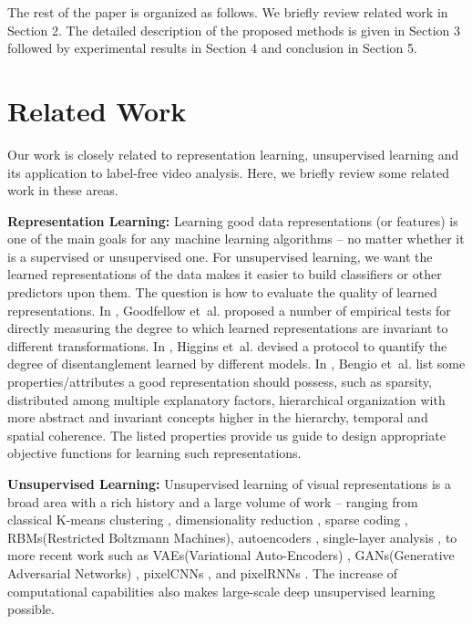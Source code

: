 \documentclass{article}
\begin{document}
The rest of the paper is organized as follows. We briefly review related work 
in Section 2. The detailed description of the proposed methods is given in
Section 3 followed by experimental results in Section 4 and conclusion in 
Section 5.

\section{Related Work}
Our work is closely related to representation learning, unsupervised 
learning and its application to label-free video analysis. Here, we briefly review some related work in these areas.

\textbf{Representation Learning:}  Learning good data representations (or 
features) is one of the main goals for any machine learning algorithms -- no 
matter whether it is a supervised or unsupervised one. For unsupervised 
learning, we want the learned representations of the data makes it easier to 
build classifiers or other predictors upon them. The question is how to 
evaluate the quality of learned representations. In \cite{Goodfellow08}, 
Goodfellow et~al. proposed a number of empirical tests for directly measuring 
the degree to which learned representations are invariant to different 
transformations.  In \cite{Higgins16}, Higgins et~al. devised a protocol to 
quantify the degree of disentanglement learned by different models. In 
\cite{Bengio13}, Bengio et~al. list some properties/attributes a good 
representation should possess, such as sparsity, distributed among multiple 
explanatory factors, hierarchical organization with more abstract and 
invariant concepts \cite{Hubel62, Wiskott02} higher in the hierarchy, temporal 
and spatial coherence. The listed properties provide us guide to design 
appropriate objective functions for learning such representations.

\textbf{Unsupervised Learning:}  Unsupervised learning of visual 
representations is a broad area with a rich history and a large volume of 
work -- ranging from classical K-means clustering \cite{MacQueen67}, 
dimensionality reduction \cite{Roweis97, Hinton06a}, sparse coding 
\cite{Olshausen96, Lee07}, RBMs(Restricted Boltzmann Machines)\cite{Hinton06b}, 
autoencoders \cite{Bengio07, Le12}, single-layer analysis \cite{Coates11}, to 
more recent work such as VAEs(Variational Auto-Encoders) \cite{Kingma14}, 
GANs(Generative Adversarial Networks) \cite{Goodfellow14}, pixelCNNs \cite{Oord16b}, and pixelRNNs \cite{Oord16a}. The increase of 
computational capabilities \cite{Raina09}  also makes large-scale deep unsupervised learning possible. 
\end{document}
